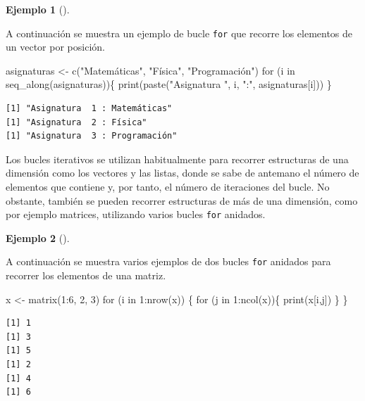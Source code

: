 \documentclass[
  a4paper,
]{scrreport}
\newenvironment{Shaded}{\begin{snugshade}}{\end{snugshade}}
\newcommand{\ControlFlowTok}[1]{\textcolor[rgb]{0.00,0.23,0.31}{#1}}
\newcommand{\DecValTok}[1]{\textcolor[rgb]{0.68,0.00,0.00}{#1}}
\newcommand{\FunctionTok}[1]{\textcolor[rgb]{0.28,0.35,0.67}{#1}}
\newcommand{\NormalTok}[1]{\textcolor[rgb]{0.00,0.23,0.31}{#1}}
\newcommand{\OtherTok}[1]{\textcolor[rgb]{0.00,0.23,0.31}{#1}}
\newcommand{\SpecialCharTok}[1]{\textcolor[rgb]{0.37,0.37,0.37}{#1}}
\newcommand{\StringTok}[1]{\textcolor[rgb]{0.13,0.47,0.30}{#1}}
\theoremstyle{definition}
\newtheorem{example}{Ejemplo}[chapter]
\theoremstyle{definition}
\theoremstyle{remark}
\begin{document}
\leavevmode{}%
\begin{example}[]\label{exm-bucle-iterativo-posicion}

A continuación se muestra un ejemplo de bucle \texttt{for} que recorre
los elementos de un vector por posición.

\begin{Shaded}
\begin{Highlighting}[]
\NormalTok{asignaturas }\OtherTok{\textless{}{-}} \FunctionTok{c}\NormalTok{(}\StringTok{"Matemáticas"}\NormalTok{, }\StringTok{"Física"}\NormalTok{, }\StringTok{"Programación"}\NormalTok{)}
\ControlFlowTok{for}\NormalTok{ (i }\ControlFlowTok{in} \FunctionTok{seq\_along}\NormalTok{(asignaturas))\{}
  \FunctionTok{print}\NormalTok{(}\FunctionTok{paste}\NormalTok{(}\StringTok{"Asignatura "}\NormalTok{, i, }\StringTok{":"}\NormalTok{, asignaturas[i]))}
\NormalTok{\}}
\end{Highlighting}
\end{Shaded}

\begin{verbatim}
[1] "Asignatura  1 : Matemáticas"
[1] "Asignatura  2 : Física"
[1] "Asignatura  3 : Programación"
\end{verbatim}

\end{example}

Los bucles iterativos se utilizan habitualmente para recorrer
estructuras de una dimensión como los vectores y las listas, donde se
sabe de antemano el número de elementos que contiene y, por tanto, el
número de iteraciones del bucle. No obstante, también se pueden recorrer
estructuras de más de una dimensión, como por ejemplo matrices,
utilizando varios bucles \texttt{for} anidados.

\leavevmode{}%
\begin{example}[]\label{exm-bucles-anidados}

A continuación se muestra varios ejemplos de dos bucles \texttt{for}
anidados para recorrer los elementos de una matriz.

\begin{Shaded}
\begin{Highlighting}[]
\NormalTok{x }\OtherTok{\textless{}{-}} \FunctionTok{matrix}\NormalTok{(}\DecValTok{1}\SpecialCharTok{:}\DecValTok{6}\NormalTok{, }\DecValTok{2}\NormalTok{, }\DecValTok{3}\NormalTok{)}
\ControlFlowTok{for}\NormalTok{ (i }\ControlFlowTok{in} \DecValTok{1}\SpecialCharTok{:}\FunctionTok{nrow}\NormalTok{(x)) \{}
  \ControlFlowTok{for}\NormalTok{ (j }\ControlFlowTok{in} \DecValTok{1}\SpecialCharTok{:}\FunctionTok{ncol}\NormalTok{(x))\{}
    \FunctionTok{print}\NormalTok{(x[i,j])}
\NormalTok{  \}}
\NormalTok{\}}
\end{Highlighting}
\end{Shaded}

\begin{verbatim}
[1] 1
[1] 3
[1] 5
[1] 2
[1] 4
[1] 6
\end{verbatim}

\end{example}
\end{document}
